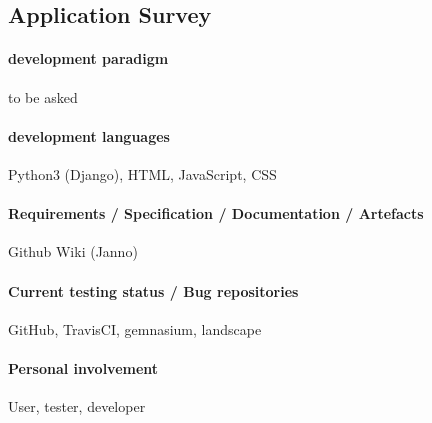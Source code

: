 \subsection{Application Survey}

\paragraph{development paradigm}

to be asked

\paragraph{development languages}

Python3 (Django), HTML, JavaScript, CSS

\paragraph{Requirements / Specification / Documentation / Artefacts}
Github Wiki
(Janno)

\paragraph{Current testing status / Bug repositories}

GitHub, TravisCI, gemnasium, landscape

\paragraph{Personal involvement}

User, tester, developer
